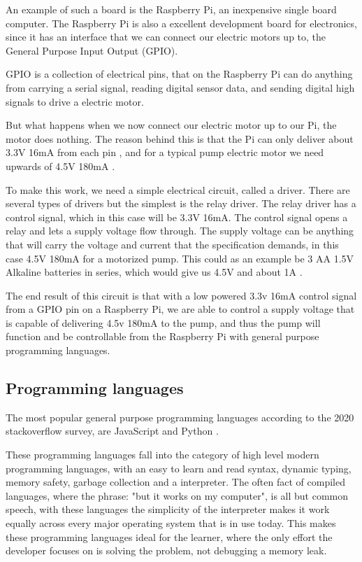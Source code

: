 \documentclass[a4paper,12pt,twoside,openright,titlepage]{book}
\begin{document}
An example of such a board is the Raspberry Pi, an inexpensive single board computer.
The Raspberry Pi is also a excellent development board for electronics, since it has an interface that we can connect our electric motors up to, the General Purpose Input Output (GPIO).

GPIO is a collection of electrical pins, that on the Raspberry Pi can do anything from carrying a serial signal, reading digital sensor data, and sending digital high signals to drive a electric motor.

But what happens when we now connect our electric motor up to our Pi, the motor does nothing.
The reason behind this is that the Pi can only deliver about 3.3V 16mA from each pin \cite{pi_pin_current}, and for a typical pump electric motor we need upwards of 4.5V 180mA \cite{aliexpress_pump}.

To make this work, we need a simple electrical circuit, called a driver. There are several types of drivers but the simplest is the relay driver.
The relay driver has a control signal, which in this case will be 3.3V 16mA.
The control signal opens a relay and lets a supply voltage flow through.
The supply voltage can be anything that will carry the voltage and current that the specification demands, in this case 4.5V 180mA for a motorized pump. This could as an example be 3 AA 1.5V Alkaline batteries in series, which would give us 4.5V and about 1A \cite{battery_current}.

The end result of this circuit is that with a low powered 3.3v 16mA control signal from a GPIO pin on a Raspberry Pi, we are able to control a supply voltage that is capable of delivering 4.5v 180mA to the pump, and thus the pump will function and be controllable from the Raspberry Pi with general purpose programming languages.

\subsection{Programming languages}
The most popular general purpose programming languages according to the 2020 stackoverflow survey, are JavaScript and Python \cite{stackoverflow_survey}.

These programming languages fall into the category of high level modern programming languages, with an easy to learn and read syntax, dynamic typing, memory safety, garbage collection and a interpreter. 
The often fact of compiled languages, where the phrase: "but it works on my computer", is all but common speech, with these languages the simplicity of the interpreter makes it work equally across every major operating system that is in use today.
This makes these programming languages ideal for the learner, where the only effort the developer focuses on is solving the problem, not debugging a memory leak.
\end{document}
